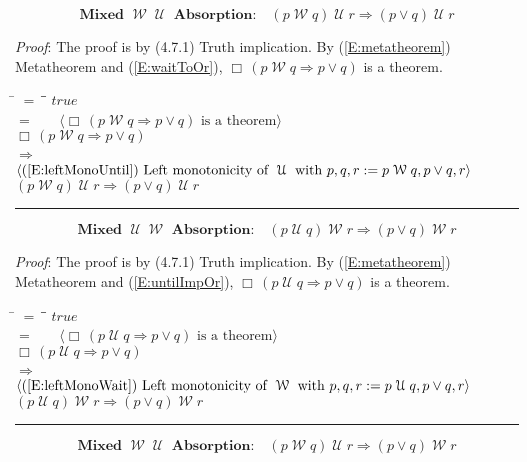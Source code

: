 \documentclass[12pt, fleqn, leqno]{article}
\newcommand{\lgap}{2pt}                             %
\newcommand{\mymathindent}{24pt}                    %
\newcommand{\impl}{\ensuremath{\Rightarrow}}        %
\newcommand{\Until}{\;\mathcal{U}\;}
\newcommand{\Wait}{\;\mathcal{W}\;}
\newcommand{\Always}{\Box\,}
\newcommand{\myqed}{\rule[-.23ex]{1.2ex}{2.0ex}}
\newcommand{\myqedtab}{\hspace{384pt}}              %
\newcommand{\Gll} {\langle}                         %
\newcommand{\Ggg} {\rangle}                         %
\newcommand{\Hint}[1]     {\ \ \ $\Gll              \mbox{#1} \Ggg$ }   %
\begin{document}
\begin{equation}\label{E:mixuntilImpAbsR}
\textbf{Mixed $\Wait\Until$ Absorption:}\quad (p \Wait q) \Until r \impl (p \lor q) \Until r
\end{equation}

\emph{Proof}: The proof is by (4.7.1) Truth implication.
By (\ref{E:metatheorem}) Metatheorem and (\ref{E:waitToOr}), $\Always (p\Wait q\impl p\lor q)$ is a theorem.
\begin{tabbing}
\hspace{\mymathindent} \= $= \;$ \= \myqedtab \= \kill
  \> \>   $true$\\[\lgap]
  \> $=$ \> \Hint{$\Always (p\Wait q\impl p\lor q)$ is a theorem} \\[\lgap]
  \> \>   $\Always (p\Wait q\impl p\lor q)$\\[\lgap]
  \> $\impl$  \>  \Hint{(\ref{E:leftMonoUntil}) Left monotonicity of $\Until$ with $p,q,r := p\Wait q, p\lor q, r$}\\[\lgap]
  \> \>   $(p \Wait q) \Until r \impl (p \lor q) \Until r$ \quad \myqed
\end{tabbing}

\begin{equation}\label{E:mix2untilImpAbsR}
\textbf{Mixed $\Until\Wait$ Absorption:}\quad (p \Until q) \Wait r \impl (p \lor q) \Wait r
\end{equation}

\emph{Proof}: The proof is by (4.7.1) Truth implication.
By (\ref{E:metatheorem}) Metatheorem and (\ref{E:untilImpOr}), $\Always (p\Until q\impl p\lor q)$ is a theorem.
\begin{tabbing}
\hspace{\mymathindent} \= $= \;$ \= \myqedtab \= \kill
  \> \>   $true$\\[\lgap]
  \> $=$ \> \Hint{$\Always (p\Until q\impl p\lor q)$ is a theorem} \\[\lgap]
  \> \>   $\Always (p\Until q\impl p\lor q)$\\[\lgap]
  \> $\impl$  \>  \Hint{(\ref{E:leftMonoWait}) Left monotonicity of $\Wait$ with $p,q,r := p\Until q, p\lor q, r$}\\[\lgap]
  \> \>   $(p \Until q) \Wait r \impl (p \lor q) \Wait r$ \quad \myqed
\end{tabbing}

\begin{equation}\label{E:mix3untilImpAbsR}
\textbf{Mixed $\Wait\Until$ Absorption:}\quad (p \Wait q) \Until r \impl (p \lor q) \Wait r
\end{equation}
\end{document}
